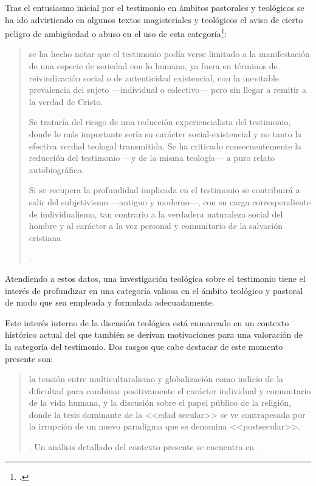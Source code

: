 Tras el entusiasmo inicial por el testimonio en ámbitos pastorales y teológicos se ha ido advirtiendo en algunos textos magisteriales y teológicos el aviso de cierto peligro de ambigüedad o abuso en el uso de esta categoría\footcite[Cf.][83]{prades2015testimonio}: \blockquote[{\Cite[84]{prades2015testimonio}}.]{se ha hecho notar que el testimonio podía verse limitado a la manifestación de una especie de seriedad con lo humano, ya fuera en términos de reivindicación social o de autenticidad existencial, con la inevitable prevalencia del sujeto ---individual o colectivo--- pero sin llegar a remitir a la verdad de Cristo. \textelp{}

Se trataría del riesgo de una reducción experiencialista del testimonio, donde lo más importante sería su carácter social-existencial y no tanto la efectiva verdad teologal transmitida. Se ha criticado consecuentemente la reducción del testimonio ---y de la misma teología--- a puro relato autobiográfico.

Si se recupera la profundidad implicada en el testimonio se contribuirá a salir del subjetivismo ---antiguo y moderno---, con su carga correspondiente de individualismo, tan contrario a la verdadera naturaleza social del hombre y al carácter a la vez personal y comunitario de la salvación cristiana}. Atendiendo a estos datos, una investigación teológica sobre el testimonio tiene el interés de profundizar en una categoría valiosa en el ámbito teológico y pastoral de modo que sea empleada y formulada adecuadamente.

Este interés interno de la discusión teológica está enmarcado en un contexto histórico actual del que también se derivan motivaciones para una valoración de la categoría del testimonio. Dos rasgos que cabe destacar de este momento presente son: \blockquote[{\Cite[75]{prades2015testimonio}}. Un análisis detallado del contexto presente se encuentra en {\cite[3-77]{prades2015testimonio}}.]{la tensión entre multiculturalismo y globalización como indicio de la dificultad para combinar positivamente el carácter individual y comunitario de la vida humana, y la discusión sobre el papel público de la religión, donde la tesis dominante de la <<edad secular>> se ve contrapesada por la irrupción de un nuevo paradigma que se denomina <<postsecular>>.}

